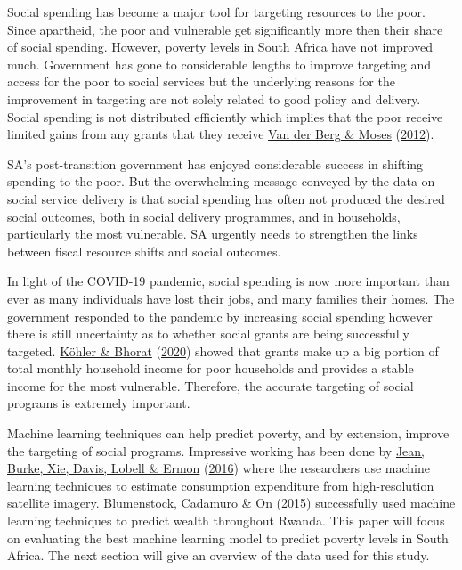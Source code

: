 \documentclass[11pt,preprint, authoryear]{elsarticle}
\numberwithin{equation}{section}
\numberwithin{figure}{section}
\numberwithin{table}{section}
\begin{document}
Social spending has become a major tool for targeting resources to the
poor. Since apartheid, the poor and vulnerable get significantly more
then their share of social spending. However, poverty levels in South
Africa have not improved much. Government has gone to considerable
lengths to improve targeting and access for the poor to social services
but the underlying reasons for the improvement in targeting are not
solely related to good policy and delivery. Social spending is not
distributed efficiently which implies that the poor receive limited
gains from any grants that they receive
\protect\hyperlink{ref-van2012better}{Van der Berg \& Moses}
(\protect\hyperlink{ref-van2012better}{2012}).

SA's post-transition government has enjoyed considerable success in
shifting spending to the poor. But the overwhelming message conveyed by
the data on social service delivery is that social spending has often
not produced the desired social outcomes, both in social delivery
programmes, and in households, particularly the most vulnerable. SA
urgently needs to strengthen the links between fiscal resource shifts
and social outcomes.

In light of the COVID-19 pandemic, social spending is now more important
than ever as many individuals have lost their jobs, and many families
their homes. The government responded to the pandemic by increasing
social spending however there is still uncertainty as to whether social
grants are being successfully targeted.
\protect\hyperlink{ref-kohler2020covid}{Köhler \& Bhorat}
(\protect\hyperlink{ref-kohler2020covid}{2020}) showed that grants make
up a big portion of total monthly household income for poor households
and provides a stable income for the most vulnerable. Therefore, the
accurate targeting of social programs is extremely important.

Machine learning techniques can help predict poverty, and by extension,
improve the targeting of social programs. Impressive working has been
done by \protect\hyperlink{ref-jean2016combining}{Jean, Burke, Xie,
Davis, Lobell \& Ermon}
(\protect\hyperlink{ref-jean2016combining}{2016}) where the researchers
use machine learning techniques to estimate consumption expenditure from
high-resolution satellite imagery.
\protect\hyperlink{ref-blumenstock2015predicting}{Blumenstock, Cadamuro
\& On} (\protect\hyperlink{ref-blumenstock2015predicting}{2015})
successfully used machine learning techniques to predict wealth
throughout Rwanda. This paper will focus on evaluating the best machine
learning model to predict poverty levels in South Africa. The next
section will give an overview of the data used for this study.
\end{document}

